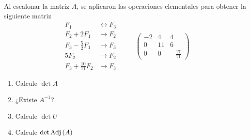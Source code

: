 \item Al escalonar la matriz \(A\), se aplicaron las operaciones elementales para obtener la siguiente matriz
    \[
        \begin{aligned}
            F_1 &\leftrightarrow F_3 \\
            F_2 + 2F_1 &\mapsto F_2 \\ 
            F_3 - \frac{5}{2}F_1 &\mapsto F_3 \\
            5F_2 &\mapsto F_2 \\ 
            F_3 + \frac{10}{11}F_2 &\mapsto F_3
        \end{aligned}
        \hspace{1cm}
        \begin{pmatrix}
            -2 & 4 & 4 \\ 
            0 & 11 & 6 \\ 
            0 & 0 & -\frac{17}{11}
        \end{pmatrix}
    \]
    \begin{enumerate}[label=\listAlph]
        \item Calcule \(\det A\)
        \item ¿Existe \(A^{-1}\)?
        \item Calcule \(\det U\)
        \item Calcule \(\det \text{Adj}\left(A\right)\)
    \end{enumerate}
